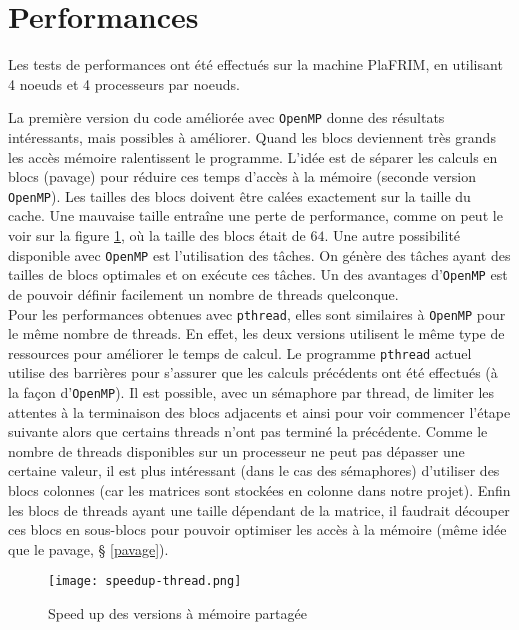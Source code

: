 \section{Performances} %
\label{sec:perf}

Les tests de performances ont été effectués sur la machine PlaFRIM, en utilisant 4 noeuds et 4 processeurs par noeuds.

La première version du code améliorée avec \texttt{OpenMP} donne des résultats intéressants, mais possibles à améliorer. Quand les blocs deviennent très grands les accès mémoire ralentissent le programme. L'idée est de séparer les calculs en blocs (pavage) pour réduire ces temps d'accès à la mémoire (seconde version \texttt{OpenMP}). Les tailles des blocs doivent être calées exactement sur la taille du cache. Une mauvaise taille entraîne une perte de performance, comme on peut le voir sur la figure \ref{fig:sp-thread}, où la taille des blocs était de $64$. Une autre possibilité disponible avec \texttt{OpenMP} est l'utilisation des tâches. On génère des tâches ayant des tailles de blocs optimales et on exécute ces tâches. Un des avantages d'\texttt{OpenMP} est de pouvoir définir facilement un nombre de threads quelconque.\\

Pour les performances obtenues avec \texttt{pthread}, elles sont similaires à \texttt{OpenMP} pour le même nombre de threads. En effet, les deux versions utilisent le même type de ressources pour améliorer le temps de calcul. Le programme \texttt{pthread} actuel utilise des barrières pour s'assurer que les calculs précédents ont été effectués (à la façon d'\texttt{OpenMP}). Il est possible, avec un sémaphore par thread, de limiter les attentes à la terminaison des blocs adjacents et ainsi pour voir commencer l'étape suivante alors que certains threads n'ont pas terminé la précédente. Comme le nombre de threads disponibles sur un processeur ne peut pas dépasser une certaine valeur, il est plus intéressant (dans le cas des sémaphores) d'utiliser des blocs colonnes (car les matrices sont stockées en colonne dans notre projet). Enfin les blocs de threads ayant une taille dépendant de la matrice, il faudrait découper ces blocs en sous-blocs pour pouvoir optimiser les accès à la mémoire (même idée que le pavage, § \ref{pavage}).


\begin{figure}[!ht]
\centering
\texttt{[image: speedup-thread.png]}
\caption{Speed up des versions à mémoire partagée}
\label{fig:sp-thread}
\end{figure}

